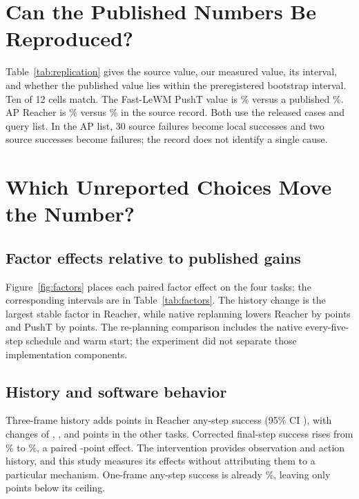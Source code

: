 \documentclass[manuscript,screen,review]{jair}
\begin{document}
\section{Can the Published Numbers Be Reproduced?}
Table~\ref{tab:replication} gives the source value, our measured value, its interval, and whether the published value lies within the preregistered bootstrap interval. Ten of 12 cells match. The Fast-LeWM PushT value is \ReproFastPushTOur\% versus a published \ReproFastPushTPaper\%. AP Reacher is \ReproAPReacherOur\% versus \ReproAPReacherPaper\% in the source record. Both use the released cases and query list. In the AP list, 30 source failures become local successes and two source successes become failures; the record does not identify a single cause.


\section{Which Unreported Choices Move the Number?}
\subsection{Factor effects relative to published gains}
Figure~\ref{fig:factors} places each paired factor effect on the four tasks; the corresponding intervals are in Table~\ref{tab:factors}. The history change is the largest stable factor in Reacher, while native replanning lowers Reacher by \ReplanReacherDelta{} points and PushT by \ReplanPushTDelta{} points. The re-planning comparison includes the native every-five-step schedule and warm start; the experiment did not separate those implementation components.


\subsection{History and software behavior}
Three-frame history adds \ReacherHistoryDeltaRevision{} points in Reacher any-step success (95\% CI \ReacherHistoryCIRevision), with changes of \PushTHistoryDeltaRevision{}, \TwoRoomHistoryDeltaRevision{}, and \CubeHistoryDeltaRevision{} points in the other tasks. Corrected final-step success rises from \ReacherLeWMOneFinal\% to \ReacherLeWMThreeFinal\%, a paired \ReacherHistoryFinalCI{}-point effect. The intervention provides observation and action history, and this study measures its effects without attributing them to a particular mechanism. One-frame any-step success is already \ReacherLeWMOneAny\%, leaving only \APReacherAnyDelta{} points below its ceiling.
\end{document}

